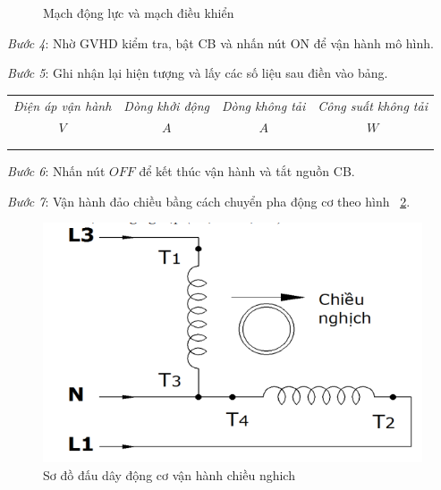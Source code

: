 \documentclass[13pt,a4paper]{extarticle}
\begin{document}
\begin{list}{--}{}
\begin{figure}[!h]
\begin{center}
\end{center}
\caption{Mạch động lực và mạch điều khiển}\label{mach-dong-luc-tu-de}
\end{figure}
\item \textit{Bước 4}: Nhờ GVHD kiểm tra, bật CB và nhấn nút ON để vận hành mô hình.
\item \textit{Bước 5}: Ghi nhận lại hiện tượng và lấy các số liệu sau điền vào bảng.
\begin{center}
\begin{tabular}{|c|c|c|c|}\hline
\textit{Điện áp vận hành} & \textit{Dòng khởi động} & \textit{Dòng không tải} & \textit{Công suất không tải}\\ 
$V$ & $A$ & $A$ & $W$ \\ \hline
& & & \\ \hline
& & & \\ \hline
\end{tabular}
\end{center}
\item \textit{Bước 6}: Nhấn nút $OFF$ để kết thúc vận hành và tắt nguồn CB.
\item \textit{Bước 7}: Vận hành đảo chiều bầng cách chuyển pha động cơ theo hình ~\ref{R-phu-nghich}.
\begin{figure}[!h]
\begin{center}
\includegraphics[scale=.5]{R-phu-nghich}
\end{center}
\caption{Sơ đồ đấu dây động cơ vận hành chiều nghich}\label{R-phu-nghich}
\end{figure}


\end{list}
\end{document}
